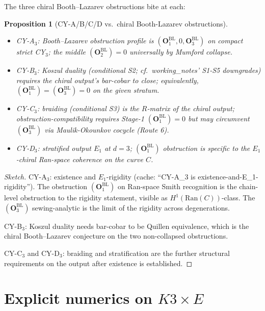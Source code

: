 \documentclass[11pt]{amsart}
\newtheorem{proposition}[theorem]{Proposition}
\newcommand{\Ran}{\mathrm{Ran}}
\begin{document}
The three chiral Booth--Lazarev obstructions bite at each:

\begin{proposition}[CY-A/B/C/D vs.\ chiral Booth-Lazarev
obstructions]
\label{prop:cyabcd-vs-bl}
\begin{itemize}[leftmargin=2em]
\item \emph{CY-A$_3$}: Booth--Lazarev obstruction profile is
$(\mathbf{O}_1^{\mathrm{BL}}, 0, \mathbf{O}_3^{\mathrm{BL}})$ on
compact strict CY$_3$; the middle $(\mathbf{O}_2^{\mathrm{BL}}) = 0$
universally by Mumford collapse.
\item \emph{CY-B$_3$}: Koszul duality (conditional S2; cf.\
working\_notes' S1-S5 downgrades) requires the chiral output's
bar-cobar to close; equivalently,
$(\mathbf{O}_1^{\mathrm{BL}}) = (\mathbf{O}_3^{\mathrm{BL}}) = 0$
on the given stratum.
\item \emph{CY-C$_3$}: braiding (conditional S3) is the
$R$-matrix of the chiral output; obstruction-compatibility
requires Stage-1 $(\mathbf{O}_1^{\mathrm{BL}}) = 0$ but
may circumvent $(\mathbf{O}_3^{\mathrm{BL}})$ via
Maulik-Okounkov cocycle (Route 6).
\item \emph{CY-D$_3$}: stratified output $E_1$ at $d = 3$;
$(\mathbf{O}_1^{\mathrm{BL}})$ obstruction is specific to
the $E_1$-chiral Ran-space coherence on the curve $C$.
\end{itemize}
\end{proposition}

\begin{proof}[Sketch]
CY-A$_3$: existence and $E_1$-rigidity (cache: ``CY-A_3 is
existence-and-E_1-rigidity''). The obstruction
$(\mathbf{O}_1^{\mathrm{BL}})$ on Ran-space Smith recognition is
the chain-level obstruction to the rigidity statement, visible as
$H^1(\Ran(C))$-class. The $(\mathbf{O}_3^{\mathrm{BL}})$
sewing-analytic is the limit of the rigidity across degenerations.

CY-B$_3$: Koszul duality needs bar-cobar to be Quillen equivalence,
which is the chiral Booth--Lazarev conjecture on the two
non-collapsed obstructions.

CY-C$_3$ and CY-D$_3$: braiding and stratification are the
further structural requirements on the output after existence is
established.
\end{proof}

\section{Explicit numerics on $K3\times E$}
\label{sec:k3xe-numerics}
\end{document}
